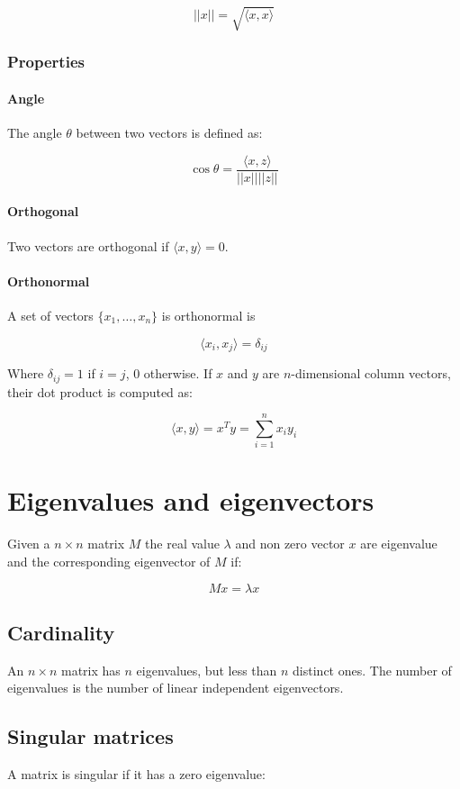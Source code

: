 		$$||x|| = \sqrt{\langle x, x\rangle}$$

		\subsubsection{Properties}

			\paragraph{Angle}
			The angle $\theta$ between two vectors is defined as:

			$$\cos\theta = \frac{\langle x, z\rangle}{||x||||z||}$$

			\paragraph{Orthogonal}
			Two vectors are orthogonal if $\langle x, y\rangle = 0$.

			\paragraph{Orthonormal}
			A set of vectors $\{x_1, \dots, x_n\}$ is orthonormal is

			$$\langle x_i, x_j\rangle = \delta_{ij}$$

			Where $\delta_{ij} = 1$ if $i = j$, $0$ otherwise.
			If $x$ and $y$ are $n$-dimensional column vectors, their dot product is computed as:

			$$\langle x, y\rangle = x^Ty = \sum\limits_{i=1}^nx_iy_i$$

\section{Eigenvalues and eigenvectors}
Given a $n\times n$ matrix $M$ the real value $\lambda$ and non zero vector $x$ are eigenvalue and the corresponding eigenvector of $M$ if:

$$Mx = \lambda x$$

	\subsection{Cardinality}
	An $n\times n$ matrix has $n$ eigenvalues, but less than $n$ distinct ones.
	The number of eigenvalues is the number of linear independent eigenvectors.

	\subsection{Singular matrices}
	A matrix is singular if it has a zero eigenvalue:

